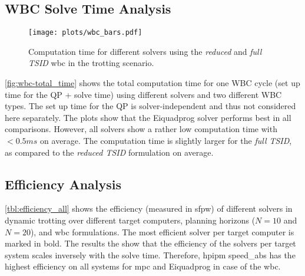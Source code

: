 

\subsection{WBC Solve Time Analysis}
\begin{figure}[!htpb]
    \centering
    \texttt{[image: plots/wbc\_bars.pdf]}
    \caption{Computation time for different solvers using the \textit{reduced} and \textit{full TSID} \gls{wbc} in the trotting scenario.}
    \label{fig:wbc-total_time}
\end{figure}
\autoref{fig:wbc-total_time} shows the total computation time for one WBC cycle (set up time for the QP + solve time) using different solvers and two different WBC types. The set up time for the QP is solver-independent and thus not considered here separately.
The plots show that the Eiquadprog solver performs best in all comparisons. However, all solvers show a rather low computation time with $<0.5 ms$ on average. The computation time is slightly larger for the \textit{full TSID}, as compared to the \textit{reduced TSID} formulation on average.

\subsection{Efficiency Analysis}
\autoref{tbl:efficiency_all} shows the efficiency (measured in \gls{sfpw}) of different solvers in dynamic trotting over different target computers, planning horizons ($N=10$ and $N=20$), and \gls{wbc} formulations.
The most efficient solver per target computer is marked in bold.
The results the  show that the efficiency of the solvers per target system scales inversely with the solve time. 
Therefore, \gls{hpipm} speed\_abs has the highest efficiency on all systems for \gls{mpc} and Eiquadprog in case of the \gls{wbc}.

